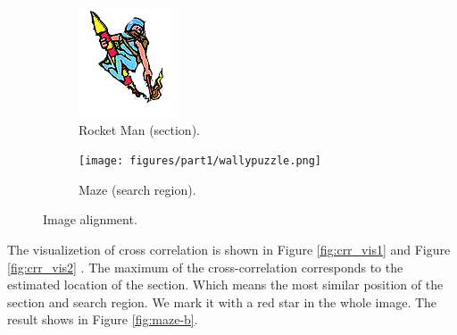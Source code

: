 \begin{figure}[h!]
	\centering
		\begin{subfigure}[t]{0.45\linewidth}
			\centering
			\includegraphics[width=0.6\linewidth]{figures/part1/wallypuzzle_rocketman.png}
			\caption{Rocket Man (section). }
			\label{fig:rocketman}
		\end{subfigure}
		\begin{subfigure}[t]{0.45\linewidth}
			\centering
			\texttt{[image: figures/part1/wallypuzzle.png]}
			\caption{Maze (search region). }
			\label{fig:maze-a}
		\end{subfigure}
		\caption{Image alignment.}
\end{figure} 

The visualizetion of cross correlation is shown in Figure \ref{fig:crr_vis1} and Figure \ref{fig:crr_vis2} . The maximum of the cross-correlation corresponds to the estimated location of the section. Which means the most similar position of the section and search region. We mark it with a red star in the whole image. The result shows in Figure \ref{fig:maze-b}.

